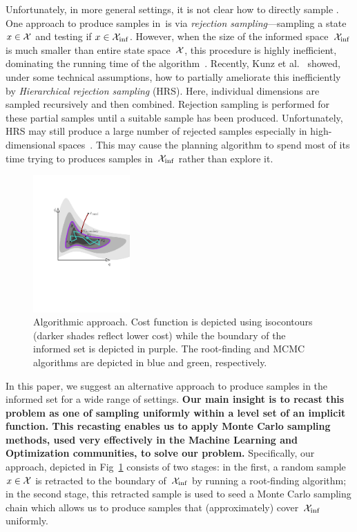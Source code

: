 \documentclass[letterpaper, 10 pt, conference]{ieeeconf}  %
\begin{document}
Unfortunately, in more general settings,
it is not clear how to directly sample \Cinf.
%
One approach to produce samples in~\Cinf is via \emph{rejection sampling}---sampling a state $x \in \mathcal{X}$ and testing if $x \in \mathcal{X}_{\rm {inf}}$.
However, when the size of the informed space~$\mathcal{X}_{\rm {inf}}$ is much smaller than entire state space~$\mathcal{X}$, this procedure is highly inefficient, dominating the running time of the algorithm~\cite{KTC16}.
Recently, Kunz et al.~\cite{KTC16} showed, under some technical assumptions, how to partially ameliorate this inefficiently by \emph{Hierarchical rejection sampling} (HRS). 
Here, individual dimensions are sampled recursively 
and then combined. Rejection sampling is performed for these partial samples until a suitable sample has been produced. 
Unfortunately, HRS may still produce a large number of rejected samples especially in high-dimensional spaces~\cite{KTC16}.
This may cause the planning algorithm to spend most of its time trying to produces samples in~$\mathcal{X}_{\rm {inf}}$ rather than explore it.

\begin{figure}[tb]
  \centering
  	\includegraphics[trim={4.5cm 0 4cm 2cm},clip,height = 5.25cm ]{fig/alg.pdf}
  \caption{
    \captionstyle
  	Algorithmic approach.
  	Cost function is depicted using isocontours (darker shades reflect lower cost) while the boundary of the informed set is depicted in purple. 
  	The root-finding and MCMC algorithms are depicted in blue and green, respectively.
  	}
   	\label{fig:alg}
\end{figure}


In this paper, we suggest an alternative approach to produce samples in the informed set \Cinf for a wide range of settings.
\textbf{
Our main insight is to recast this problem as one of sampling uniformly within a level set of an implicit function.
This recasting enables us to apply Monte Carlo sampling methods, used very effectively in the Machine Learning and Optimization communities, to solve our problem.
}
Specifically, our approach, depicted in Fig~\ref{fig:alg} consists of two stages:
in the first, a random sample $x \in \mathcal{X}$ is retracted to the boundary of~$\mathcal{X}_{\rm {inf}}$ by running a root-finding algorithm;
in the second stage, this retracted sample  is used to seed a Monte Carlo sampling chain which allows us to  produce samples that (approximately) cover~$\mathcal{X}_{\rm {inf}}$  uniformly.
\end{document}
